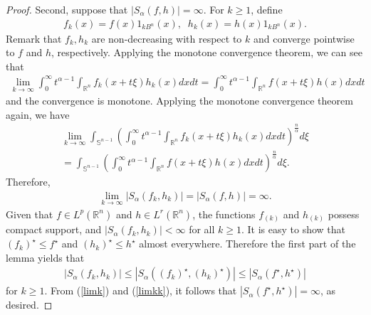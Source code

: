 \documentclass[10pt,a4paper]{amsart}
\begin{document}
\begin{proof}
	Second, suppose that $| {S}_{\alpha }(f,h)| =\infty $. For $k\ge 1
	$, define
	\begin{eqnarray*}
		{f}_{k}(x)=f(x){1}_{kB^{n}}(x),\;\;{h}_{k}(x)=h(x){1}_{kB^{n}}(x).
	\end{eqnarray*} 
Remark that ${f}_{k}, {h}_{k}$ are non-decreasing with respect to $k$ and converge pointwise to $f$ and $h$, respectively.
	Applying the monotone convergence theorem, we can see that
	\begin{eqnarray*}
		\lim_{k\to \infty }\int_{0}^{\infty }{t }^{\alpha-1}\int_{\mathbb{R}^n}f_{k}(x+t\xi )h_{k}(x)dxdt=\int_{0}^{\infty }{t }^{\alpha-1}\int_{\mathbb{R}^n}f(x+t\xi )h(x)dxdt
	\end{eqnarray*} 
	and the convergence is monotone. Applying the monotone convergence theorem again, we have
	\begin{eqnarray*}
		\lim_{k\to \infty }\int_{\mathbb{S}^{n-1}}\left(\int_{0}^{\infty }{t }^{\alpha-1}\int_{\mathbb{R}^n}f_{k}(x+t\xi )h_{k}(x)dxdt\right)^{\frac{n}{\alpha }}d\xi \\	=\int_{\mathbb{S}^{n-1}}\left(\int_{0}^{\infty }{t }^{\alpha-1}\int_{\mathbb{R}^n}f(x+t\xi )h(x)dxdt\right)^{\frac{n}{\alpha }}d\xi .
	\end{eqnarray*} 
	Therefore,
	\begin{eqnarray}\label{limk}
		\lim_{k\to \infty }| {S}_{\alpha }(f_{k},h_{k})|=| {S}_{\alpha }(f,h)|=\infty.
	\end{eqnarray} 
	Given that $f\in {L}^{p} (\mathbb{R}^n)$ and $h\in {L}^{r} (\mathbb{R}^n)$, the functions $f_{(k)}$ and $h_{(k)}$ possess compact support, and $| {S}_{\alpha }(f_{k},h_{k})| < \infty $ for all $k\ge 1$. It is easy to show that $(f_{k})^{\star } \le f^{\star }$ and $(h_{k})^{\star } \le h^{\star }$ almost everywhere. Therefore the first part of the lemma yields that
	\begin{eqnarray}\label{limkk}
		| {S}_{\alpha }(f_{k},h_{k})| \leq  | {S}_{\alpha }((f_{k})^{\star },(h_{k})^{\star })|\leq  | {S}_{\alpha }(f^{\star },h^{\star })|
	\end{eqnarray} 
	for $k\ge 1$. From (\ref{limk}) and (\ref{limkk}), it follows that $| {S}_{\alpha }(f^{\star },h^{\star })|=\infty$, as desired.
\end{proof}
\end{document}
